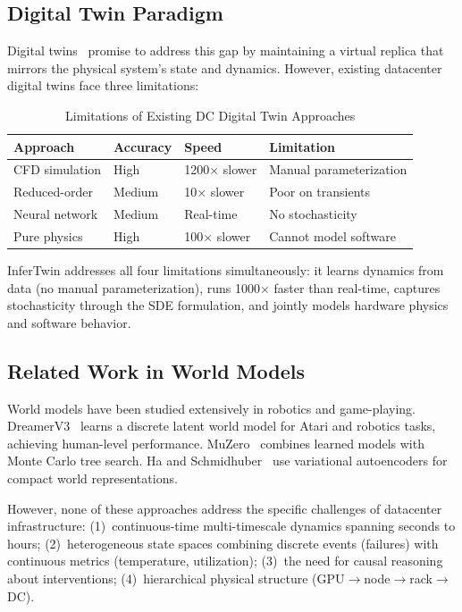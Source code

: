 \documentclass[conference,10pt]{IEEEtran}
\begin{document}
\subsection{Digital Twin Paradigm}

Digital twins~\cite{grieves2014digital,tao2018digital} promise to address this gap by maintaining a virtual replica that mirrors the physical system's state and dynamics. However, existing datacenter digital twins face three limitations:

\begin{table}[!htbp]
\caption{Limitations of Existing DC Digital Twin Approaches}
\label{tab:dtlimits}
\centering\scriptsize
\begin{tabular}{@{}llll@{}}
\toprule
\textbf{Approach} & \textbf{Accuracy} & \textbf{Speed} & \textbf{Limitation} \\
\midrule
CFD simulation & High & 1200$\times$ slower & Manual parameterization \\
Reduced-order & Medium & 10$\times$ slower & Poor on transients \\
Neural network & Medium & Real-time & No stochasticity \\
Pure physics & High & 100$\times$ slower & Cannot model software \\
\bottomrule
\end{tabular}
\end{table}

InferTwin addresses all four limitations simultaneously: it learns dynamics from data (no manual parameterization), runs 1000$\times$ faster than real-time, captures stochasticity through the SDE formulation, and jointly models hardware physics and software behavior.


\subsection{Related Work in World Models}

World models have been studied extensively in robotics and game-playing. DreamerV3~\cite{hafner2023dreamerv3} learns a discrete latent world model for Atari and robotics tasks, achieving human-level performance. MuZero~\cite{schrittwieser2020muzero} combines learned models with Monte Carlo tree search. Ha and Schmidhuber~\cite{ha2018world} use variational autoencoders for compact world representations.

However, none of these approaches address the specific challenges of datacenter infrastructure: (1)~continuous-time multi-timescale dynamics spanning seconds to hours; (2)~heterogeneous state spaces combining discrete events (failures) with continuous metrics (temperature, utilization); (3)~the need for causal reasoning about interventions; (4)~hierarchical physical structure (GPU$\to$node$\to$rack$\to$DC).
\end{document}

